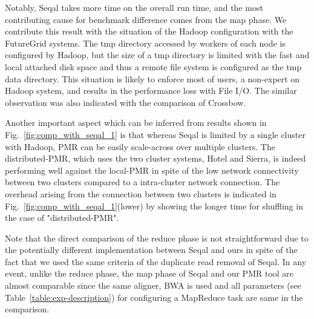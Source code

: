 \documentclass{acm_proc_article-sp}
\begin{document}
Notably, Seqal takes more time on the overall run time, and the most
contributing cause for benchmark difference comes from the map phase.
We contribute this result with the situation of the Hadoop
configuration with the FutureGrid systems.  The tmp directory accessed
by workers of each node is configured by Hadoop, but the size of a tmp
directory is limited with the fast and local attached disk space and
thus a remote file system is configured as the tmp data directory.
This situation is likely to enforce most of users, a non-expert on
Hadoop system, and results in the performance loss with File I/O.  The
similar observation was also indicated with the comparison of
Crossbow.

Another important aspect which can be inferred from results shown in
Fig.~\ref{fig:comp_with_seqal_1} is that whereas Seqal is limited by a
single cluster with Hadoop, PMR can be easily scale-across over
multiple clusters. The distributed-PMR, which uses the two cluster
systems, Hotel and Sierra, is indeed performing well against the
local-PMR in spite of the low network connectivity between two
clusters compared to a intra-cluster network connection.  The overhead
arising from the connection between two clusters is indicated in
Fig.~\ref{fig:comp_with_seqal_1}(lower) by showing the longer time for
shuffling in the case of "distributed-PMR".

Note that the direct comparison of the reduce phase is not straightforward due to the potentially different implementation between Seqal and ours in spite of the fact that we used the same criteria of the duplicate read removal of Seqal\cite{seal_2011_mapred}.  In any event, unlike the reduce phase, the map phase of Seqal and our PMR tool are almost comparable since the same aligner, BWA is used and all parameters (see Table~\ref{table:exp-description}) for configuring a MapReduce task are same in the comparison.   
\end{document}
